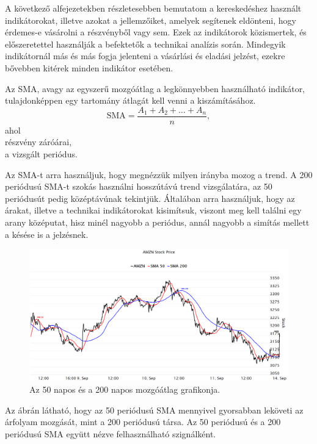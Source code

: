 A következő alfejezetekben részletesebben bemutatom a kereskedéshez használt indikátorokat, illetve azokat a jellemzőiket, amelyek segítenek eldönteni, hogy érdemes-e vásárolni a részvényből vagy sem. Ezek az indikátorok közismertek, és előszeretettel használják a befektetők a technikai analízis során. Mindegyik indikátornál más és más fogja jelenteni a vásárlási és eladási jelzést, ezekre bővebben kitérek minden indikátor esetében.

Az SMA, avagy az egyszerű mozgóátlag a legkönnyebben használható indikátor, tulajdonképpen egy tartomány átlagát kell venni a kiszámításához.
$$
\text{SMA} = \frac{A_1 + A_2 + \ldots + A_n}{n},
$$
ahol \\
\hspace*{9mm}  részvény záróárai, \\
\hspace*{9mm}  a vizsgált periódus.

\noindent Az SMA-t arra használjuk, hogy megnézzük milyen irányba mozog a trend. A 200 periódusú SMA-t szokás használni hosszútávú trend vizsgálatára, az 50 periódusút pedig középtávúnak tekintjük. Általában arra használjuk, hogy az árakat, illetve a technikai indikátorokat kisimítsuk, viszont meg kell találni egy arany középutat, hisz minél nagyobb a periódus, annál nagyobb a simítás mellett a késése is a jelzésnek.

\begin{figure}[ht]
\centering
\includegraphics[width=\textwidth]{images/trend.png}
\caption{Az 50 napos és a 200 napos mozgóátlag grafikonja.}
\label{fig:trend}
\end{figure}

Az ábrán látható, hogy az 50 periódusú SMA mennyivel gyorsabban leköveti az árfolyam mozgását, mint a 200 periódusú társa. Az 50 periódusú és a 200 periódusú SMA együtt nézve felhasználható szignálként.

